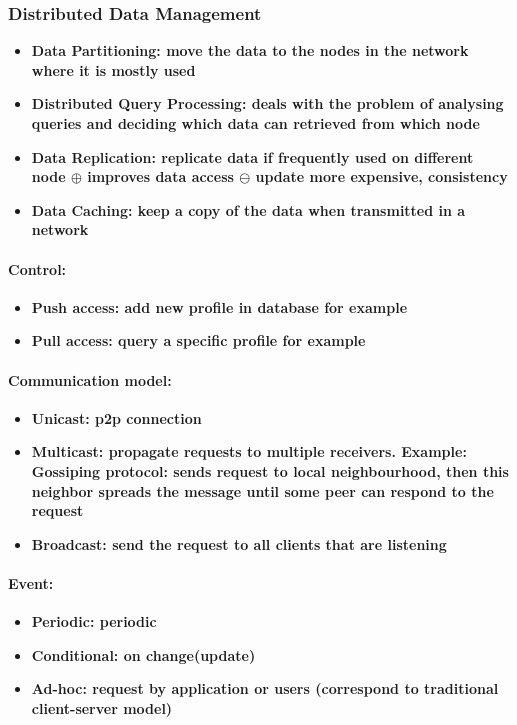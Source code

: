\subsubsection{Distributed Data Management}
\begin{itemize}
\item \bf{Data Partitioning:} move the data to the nodes in the network where it is mostly used
\item \bf{Distributed Query Processing:}  deals with the problem of analysing queries and deciding which data can retrieved from which node
\item \bf{Data Replication:} replicate data if frequently used on different node $\oplus$ improves data access $\ominus$ update more expensive, consistency
\item \bf{Data Caching:} keep a copy of the data when transmitted in a network
\end{itemize}

\paragraph{Control:}
\begin{itemize}
\item \bf{Push access:} add new profile in database for example
\item \bf{Pull access:} query a specific profile for example
\end{itemize}


\paragraph{Communication model:}
\begin{itemize}
\item \bf{Unicast:} p2p connection
\item \bf{Multicast:} propagate requests to multiple receivers. Example: \bf{Gossiping protocol:} sends request to local neighbourhood, then this neighbor spreads the message until some peer can respond to the request
\item \bf{Broadcast:} send the request to all clients that are listening
\end{itemize}

\paragraph{Event:}
\begin{itemize}
\item \bf{Periodic:} periodic
\item \bf{Conditional:} on change(update)
\item \bf{Ad-hoc:} request by application or users (correspond to traditional client-server model)
\end{itemize}

